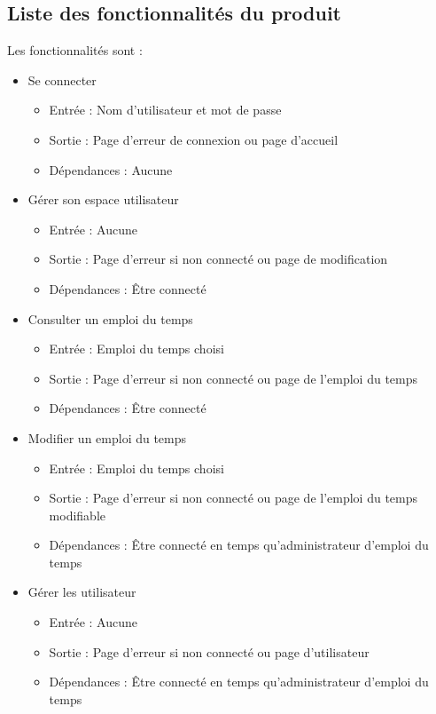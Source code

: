 \documentclass[a4paper, 11pt]{article}
\begin{document}
        \subsection{ Liste des fonctionnalités du produit}
        Les fonctionnalités sont :
	\begin{itemize}
		\item Se connecter
		\begin{itemize}
			\item Entrée : Nom d'utilisateur et mot de passe
			\item Sortie : Page d'erreur de connexion ou page d'accueil
			\item Dépendances : Aucune
		\end{itemize}
		\item Gérer son espace utilisateur
		\begin{itemize}
			\item Entrée : Aucune
			\item Sortie : Page d'erreur si non connecté ou page de modification
			\item Dépendances : Être connecté
		\end{itemize}
		\item Consulter un emploi du temps
		\begin{itemize}
			\item Entrée : Emploi du temps choisi
			\item Sortie : Page d'erreur si non connecté ou page de l'emploi du temps
			\item Dépendances : Être connecté
		\end{itemize}
		\item Modifier un emploi du temps
		\begin{itemize}
			\item Entrée : Emploi du temps choisi
			\item Sortie : Page d'erreur si non connecté ou page de l'emploi du temps modifiable
			\item Dépendances : Être connecté en temps qu'administrateur d'emploi du temps
		\end{itemize}
		\item Gérer les utilisateur
		\begin{itemize}
			\item Entrée : Aucune
			\item Sortie : Page d'erreur si non connecté ou page d'utilisateur
			\item Dépendances : Être connecté en temps qu'administrateur d'emploi du temps

\end{itemize}
\end{itemize}
\end{document}
